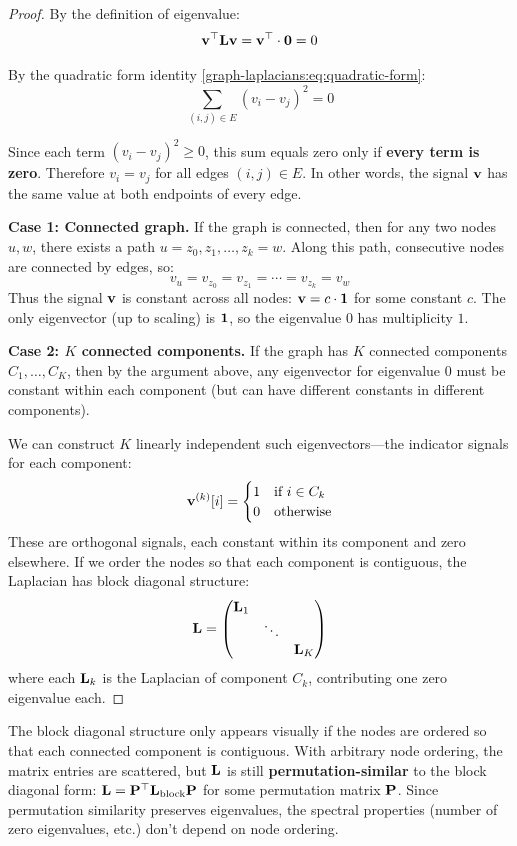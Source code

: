 \begin{notechapter}
\begin{proof}
By the definition of eigenvalue:
\[
\mathbf{v}^\top \mathbf{L} \mathbf{v} = \mathbf{v}^\top \cdot \mathbf{0} = 0
\]

By the quadratic form identity \eqref{graph-laplacians:eq:quadratic-form}:
\[
\sum_{(i,j) \in E} (v_i - v_j)^2 = 0
\]

Since each term $(v_i - v_j)^2 \geq 0$, this sum equals zero only if \textbf{every term is zero}. Therefore $v_i = v_j$ for all edges $(i,j) \in E$. In other words, the signal $\mathbf{v}$ has the same value at both endpoints of every edge.

\textbf{Case 1: Connected graph.} If the graph is connected, then for any two nodes $u, w$, there exists a path $u = z_0, z_1, \ldots, z_k = w$. Along this path, consecutive nodes are connected by edges, so:
\[
v_u = v_{z_0} = v_{z_1} = \cdots = v_{z_k} = v_w
\]
Thus the signal $\mathbf{v}$ is constant across all nodes: $\mathbf{v} = c \cdot \mathbf{1}$ for some constant $c$. The only eigenvector (up to scaling) is $\mathbf{1}$, so the eigenvalue $0$ has multiplicity $1$.

\textbf{Case 2: $K$ connected components.} If the graph has $K$ connected components $C_1, \ldots, C_K$, then by the argument above, any eigenvector for eigenvalue $0$ must be constant within each component (but can have different constants in different components). 

We can construct $K$ linearly independent such eigenvectors---the indicator signals for each component:
\[
\mathbf{v}^{(k)}[i] = \begin{cases} 1 & \text{if } i \in C_k \\ 0 & \text{otherwise} \end{cases}
\]
These are orthogonal signals, each constant within its component and zero elsewhere. If we order the nodes so that each component is contiguous, the Laplacian has block diagonal structure:
\[
\mathbf{L} = \begin{pmatrix} \mathbf{L}_1 & & \\ & \ddots & \\ & & \mathbf{L}_K \end{pmatrix}
\]
where each $\mathbf{L}_k$ is the Laplacian of component $C_k$, contributing one zero eigenvalue each.
\end{proof}

\begin{remark}
The block diagonal structure only appears visually if the nodes are ordered so that each connected component is contiguous. With arbitrary node ordering, the matrix entries are scattered, but $\mathbf{L}$ is still \textbf{permutation-similar} to the block diagonal form: $\mathbf{L} = \mathbf{P}^\top \mathbf{L}_{\text{block}} \mathbf{P}$ for some permutation matrix $\mathbf{P}$. Since permutation similarity preserves eigenvalues, the spectral properties (number of zero eigenvalues, etc.) don't depend on node ordering.
\end{remark}


\end{notechapter}

